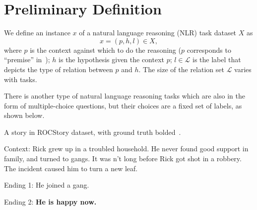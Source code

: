 \section{Preliminary Definition}
\label{sec:formulation}
We define an instance $x$ of a natural language reasoning (NLR) task 
dataset $X$ as
\begin{equation}
    x = (p, h, l) \in X, \label{eq:nli}
\end{equation}
\noindent
where $p$ is the context against which to do the reasoning ($p$ corresponds 
to ``premise'' in~);
$h$ is the hypothesis given the context $p$; 
$l \in \mathcal{L}$ is the label that 
depicts the type of relation between $p$ and $h$. 
The size of the relation set $\mathcal{L}$ varies with tasks. 



There is another type of natural language reasoning tasks which 
are also in the form of multiple-choice questions, 
but their choices are a fixed set of labels, as shown below. 
\begin{example}\label{exp:roc}
A story in ROCStory dataset, with ground truth bolded~\cite{mostafazadeh2016corpus}.
\begin{description}
\item{Context:} Rick grew up in a troubled household. 
He never found good support in family, and turned to gangs.           
It was n't long before Rick got shot in a robbery.             
The incident caused him to turn a new leaf.
\item{Ending 1:} He joined a gang. 
\item{Ending 2:}  \textbf{He is happy now.}
\end{description}
\end{example}

